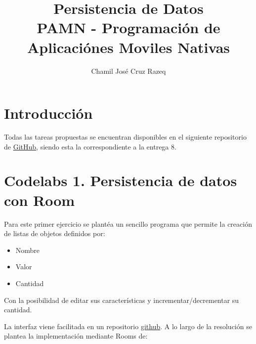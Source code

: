 \documentclass{article}
\title{Persistencia de Datos \\[3ex] \small PAMN - Programación de Aplicaciónes Moviles Nativas}
\author{Chamil José Cruz Razeq}
\begin{document}
    \maketitle
    \thispagestyle{empty}
    \newpage

    \section{Introducción}
        Todas las tareas propuestas se encuentran disponibles en el siguiente
         repositorio de \href{https://github.com/chamilstudy/ulpgc_pamn_assigments}{GitHub},
         siendo esta la correspondiente a la entrega 8.

    \section{Codelabs 1. Persistencia de datos con Room}
        Para este primer ejercicio se plantéa un sencillo programa que permite la creación
         de listas de objetos definidos por:
         \begin{itemize}
            \item Nombre
            \item Valor
            \item Cantidad
         \end{itemize}
        Con la posibilidad de editar sus características y incrementar/decrementar su
        cantidad.

        La interfaz viene facilitada en un repositorio \href{https://github.com/google-developer-training/basic-android-kotlin-compose-training-inventory-app.git}{github}.
        A lo largo de la resolución se plantea la implementación mediante Rooms de:
\end{document}
